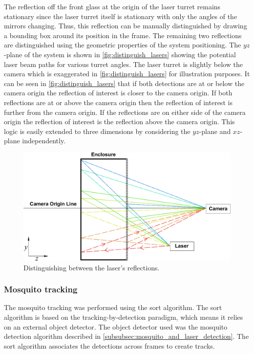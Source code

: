 The reflection off the front glass at the origin of the laser turret remains stationary since the laser turret itself is stationary with only the angles of the mirrors changing. Thus, this reflection can be manually distinguished by drawing a bounding box around its position in the frame. The remaining two reflections are distinguished using the geometric properties of the system positioning. The $yz$-plane of the system is shown in \autoref{fig:distinguish_lasers} showing the potential laser beam paths for various turret angles. The laser turret is slightly below the camera which is exaggerated in \autoref{fig:distinguish_lasers} for illustration purposes. It can be seen in \autoref{fig:distinguish_lasers} that if both detections are at or below the camera origin the reflection of interest is closer to the camera origin. If both reflections are at or above the camera origin then the  reflection of interest is further from the camera origin. If the reflections are on either side of the camera origin the reflection of interest is the reflection above the camera origin. This logic is easily extended to three dimensions by considering the $yz$-plane and $xz$-plane independently.
\begin{figure}[h]
  \centering
  \includegraphics[width=\textwidth]{figures/distinguish_lasers.pdf}
  \caption{Distinguishing between the laser's reflections.}
  \label{fig:distinguish_lasers}
\end{figure}



\subsubsection{Mosquito tracking}
The mosquito tracking was performed using the \gls{sort} algorithm. The \gls{sort} algorithm is based on the tracking-by-detection paradigm, which means it relies on an external object detector. The object detector used was the mosquito detection algorithm described in \autoref{subsubsec:mosquito_and_laser_detection}. The \gls{sort} algorithm associates the detections across frames to create tracks.


